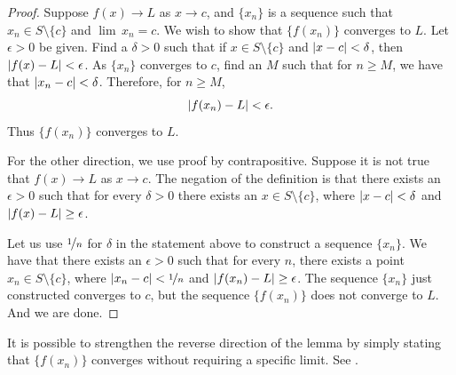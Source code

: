 \begin{proof}
Suppose 
$f(x) \to L$ as $x \to c$, and $\{ x_n \}$ is a sequence
such that
$x_n \in S \setminus \{c\}$ and
$\lim\, x_n = c$.
We wish to show that $\{ f(x_n) \}$ converges to $L$.
Let $\epsilon > 0$ be given.  Find a $\delta > 0$ such that
if $x \in S \setminus \{c\}$ and $\left\lvert {x-c} \right\rvert < \delta$, then
$\left\lvert {f(x) - L} \right\rvert < \epsilon$.  As
$\{ x_n \}$  converges to $c$, find an $M$ such that for $n \geq M$,
we have that $\left\lvert {x_n - c} \right\rvert < \delta$.  Therefore, for $n \geq M$,
\begin{equation*}
\left\lvert {f(x_n) - L} \right\rvert < \epsilon .
\end{equation*}
Thus $\{ f(x_n) \}$ converges to $L$.

For the other direction, we use proof by contrapositive.  Suppose 
it is not true that $f(x) \to L$ as $x \to c$.  The negation of the
definition is that there exists an $\epsilon > 0$ such that for every
$\delta > 0$ there exists an $x \in S \setminus \{c\}$, where
$\left\lvert {x-c} \right\rvert < \delta$
and $\left\lvert {f(x)-L} \right\rvert \geq \epsilon$.

Let us use $\nicefrac{1}{n}$ for $\delta$ in the statement above to
construct a sequence $\{ x_n \}$.  We have
that there exists an $\epsilon > 0$ such that for every $n$,
there exists a point $x_n \in S \setminus \{c\}$, where
$\left\lvert {x_n-c} \right\rvert < \nicefrac{1}{n}$
and $\left\lvert {f(x_n)-L} \right\rvert \geq \epsilon$.
The sequence $\{ x_n \}$ just constructed converges to $c$, but
the sequence $\{ f(x_n) \}$ does not converge to $L$.
And we are done.
\end{proof}

It is possible to strengthen the reverse direction of
the lemma by simply stating that
$\{ f(x_n) \}$ converges without requiring a specific limit.
See .

